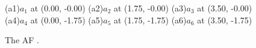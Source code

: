 \documentclass[crop,margin=5mm]{article}
\begin{document}
\begin{figure}
    \centering
    \begin{af}
        \argument[](a1){$a_{1}$} at (0.00, -0.00)
    	\argument[](a2){$a_{2}$} at (1.75, -0.00)
    	\argument[](a3){$a_{3}$} at (3.50, -0.00)
    	\argument[](a4){$a_{4}$} at (0.00, -1.75)
    	\argument[](a5){$a_{5}$} at (1.75, -1.75)
    	\argument[](a6){$a_{6}$} at (3.50, -1.75)
        \label{af:123}
    \end{af}
    \caption{The AF .}
    \label{fig:af123}
\end{figure}
\end{document}
